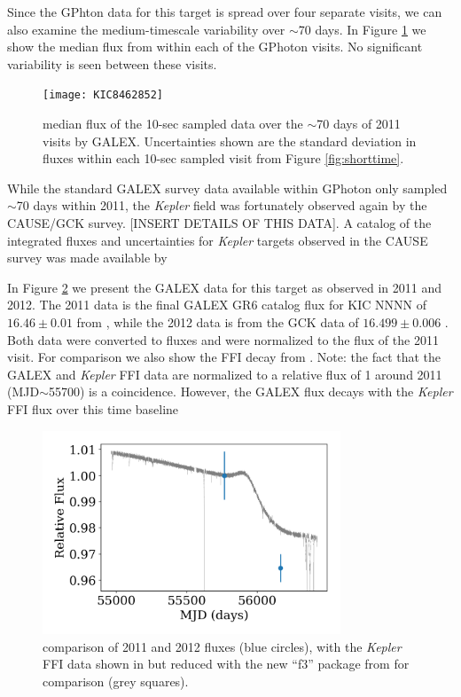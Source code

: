 \documentclass[manuscript, letterpaper]{aastex6}
\makeatletter
\let\origsection\section
\renewcommand\section{\@ifstar{\starsection}{\nostarsection}}
\newcommand\nostarsection[1]{\sectionprelude\origsection{#1}}
\newcommand\starsection[1]{\sectionprelude\origsection*{#1}}
\newcommand\sectionprelude{\vspace{1em}}
\newcommand{\Kepler}{\textsl{Kepler}\xspace}
\makeatother
\begin{document}
Since the GPhton data for this target is spread over four separate visits, we can also examine the medium-timescale variability over $\sim$70 days. In Figure \ref{fig:medtime} we show the median flux from within each of the GPhoton visits. No significant variability is seen between these visits.

\begin{figure}[]
\centering
\texttt{[image: KIC8462852]}
\caption{median flux of the 10-sec sampled data over the $\sim$70 days of 2011 visits by GALEX. Uncertainties shown are the standard deviation in fluxes within each 10-sec sampled visit from Figure \ref{fig:shorttime}.
}
\label{fig:medtime}
\end{figure}





\section{Long Timescale Variability}

While the standard GALEX survey data available within GPhoton only sampled $\sim$70 days within 2011, the \Kepler field was fortunately observed again by the CAUSE/GCK survey. [INSERT DETAILS OF THIS DATA]. A catalog of the integrated fluxes and uncertainties for \Kepler targets observed in the CAUSE survey was made available by \citet{olmedo2015}


In Figure \ref{fig:longtime} we present the GALEX data for this target as observed in 2011 and 2012. The 2011 data is the final GALEX GR6 catalog flux for KIC NNNN of $16.46 \pm 0.01$ from \citet{bianchi2014}, while the 2012 data is from the GCK data of $16.499\pm0.006$ \citet{olmedo2015}. Both data were converted to fluxes and were normalized to the flux of the 2011 visit. For comparison we also show the FFI decay from \citet{montet2016}. Note: the fact that the GALEX and \Kepler FFI data are normalized to a relative flux of 1 around 2011 (MJD$\sim$55700) is a coincidence. However, the GALEX flux decays with the \Kepler FFI flux over this time baseline

\begin{figure}[]
\centering
\includegraphics[width=3.5in]{KIC8462852_compare}
\caption{comparison of 2011 and 2012 fluxes (blue circles), with the \Kepler FFI data shown in \citet{montet2016} but reduced with the new ``f3'' package from \citet{montet2017} for comparison (grey squares).}
\label{fig:longtime}
\end{figure}
\end{document}
